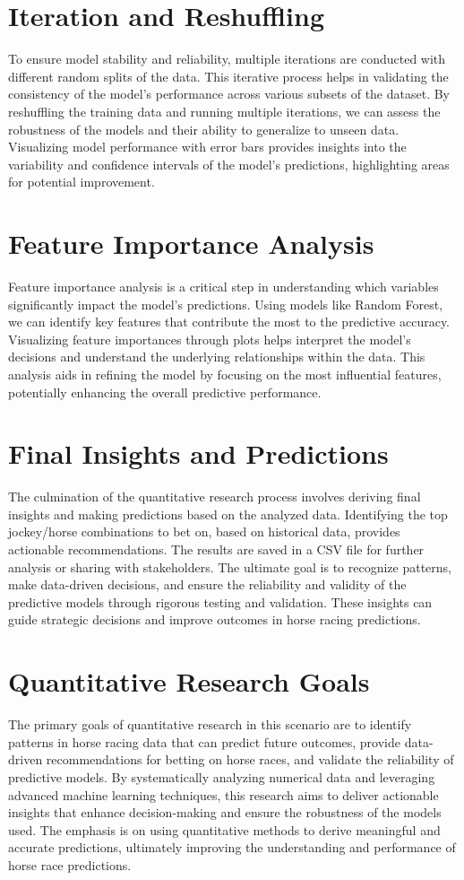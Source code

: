 \documentclass{article}
\begin{document}
\section*{Iteration and Reshuffling}
To ensure model stability and reliability, multiple iterations are conducted with different random splits of the data. This iterative process helps in validating the consistency of the model's performance across various subsets of the dataset. By reshuffling the training data and running multiple iterations, we can assess the robustness of the models and their ability to generalize to unseen data. Visualizing model performance with error bars provides insights into the variability and confidence intervals of the model's predictions, highlighting areas for potential improvement.

\section*{Feature Importance Analysis}
Feature importance analysis is a critical step in understanding which variables significantly impact the model's predictions. Using models like Random Forest, we can identify key features that contribute the most to the predictive accuracy. Visualizing feature importances through plots helps interpret the model's decisions and understand the underlying relationships within the data. This analysis aids in refining the model by focusing on the most influential features, potentially enhancing the overall predictive performance.

\section*{Final Insights and Predictions}
The culmination of the quantitative research process involves deriving final insights and making predictions based on the analyzed data. Identifying the top jockey/horse combinations to bet on, based on historical data, provides actionable recommendations. The results are saved in a CSV file for further analysis or sharing with stakeholders. The ultimate goal is to recognize patterns, make data-driven decisions, and ensure the reliability and validity of the predictive models through rigorous testing and validation. These insights can guide strategic decisions and improve outcomes in horse racing predictions.

\section*{Quantitative Research Goals}
The primary goals of quantitative research in this scenario are to identify patterns in horse racing data that can predict future outcomes, provide data-driven recommendations for betting on horse races, and validate the reliability of predictive models. By systematically analyzing numerical data and leveraging advanced machine learning techniques, this research aims to deliver actionable insights that enhance decision-making and ensure the robustness of the models used. The emphasis is on using quantitative methods to derive meaningful and accurate predictions, ultimately improving the understanding and performance of horse race predictions.
\end{document}
